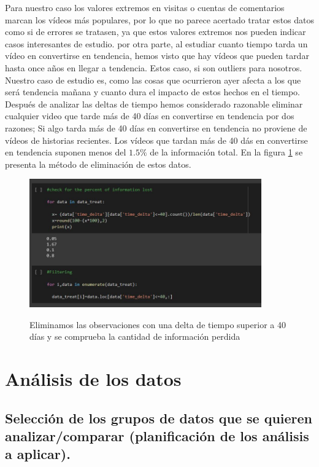 \documentclass[a4paper,12pt]{article}
\begin{document}
Para nuestro caso los valores extremos en visitas o cuentas de comentarios marcan los v\'ideos m\'as populares, por lo que no parece acertado tratar estos datos como si de errores se tratasen, ya que estos valores extremos nos pueden indicar casos interesantes de estudio. por otra parte, al estudiar cuanto tiempo tarda un v\'ideo en convertirse  en tendencia, hemos visto que hay v\'ideos que pueden tardar hasta once a\~nos en llegar a tendencia. Estos caso, si son outliers  para nosotros. Nuestro caso de estudio es, como las cosas que ocurrieron ayer afecta a los que ser\'a tendencia ma\~nana y cuanto dura el impacto de estos hechos en el tiempo. Despu\'es de analizar las deltas de tiempo hemos considerado razonable eliminar cualquier video que tarde m\'as de 40 d\'ias en convertirse en tendencia por dos razones; Si algo tarda m\'as de 40 d\'ias en convertirse en tendencia no proviene de v\'ideos de historias recientes. Los v\'ideos que tardan m\'as de 40 d\'as en convertirse en tendencia suponen menos del $1.5\%$ de la informaci\'on total. En la figura \ref{fig:delta} se presenta la m\'etodo de eliminaci\'on de estos datos.

\begin{figure}[h!]
\centering
\includegraphics[width=10cm]{tiempo.JPG}\\
\caption{Eliminamos las observaciones con una delta de tiempo superior a 40 d\'ias y se comprueba la cantidad de informaci\'on perdida}
\label{fig:delta}
\end{figure}

\section{An\'alisis de los datos}

\subsection{Selecci\'on de los grupos de datos que se quieren analizar/comparar (planificaci\'on de los an\'alisis a aplicar).}
\end{document}
